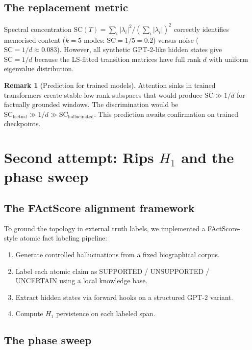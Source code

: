 \documentclass[11pt]{amsart}
\theoremstyle{definition}
\newtheorem{remark}[theorem]{Remark}
\begin{document}
\subsection{The replacement metric}

Spectral concentration $\mathrm{SC}(T) = \sum_i |\lambda_i|^2 / (\sum_i |\lambda_i|)^2$
correctly identifies memorised content ($k=5$ modes: $\mathrm{SC} = 1/5 = 0.2$)
versus noise ($\mathrm{SC} = 1/d \approx 0.083$).
However, all synthetic GPT-2-like hidden states give $\mathrm{SC} = 1/d$
because the LS-fitted transition matrices have full rank $d$ with
uniform eigenvalue distribution.

\begin{remark}[Prediction for trained models]
Attention sinks in trained transformers create stable low-rank subspaces
that would produce $\mathrm{SC} \gg 1/d$ for factually grounded windows.
The discrimination would be $\mathrm{SC}_\mathrm{factual} \gg 1/d \gg \mathrm{SC}_\mathrm{hallucinated}$.
This prediction awaits confirmation on trained checkpoints.
\end{remark}

\section{Second attempt: Rips $H_1$ and the phase sweep}
\label{sec:rips}

\subsection{The FActScore alignment framework}

To ground the topology in external truth labels, we implemented a
FActScore-style atomic fact labeling pipeline:
\begin{enumerate}
\item Generate controlled hallucinations from a fixed biographical corpus.
\item Label each atomic claim as SUPPORTED / UNSUPPORTED / UNCERTAIN
      using a local knowledge base.
\item Extract hidden states via forward hooks on a structured GPT-2 variant.
\item Compute $H_1$ persistence on each labeled span.
\end{enumerate}

\subsection{The phase sweep}
\end{document}
